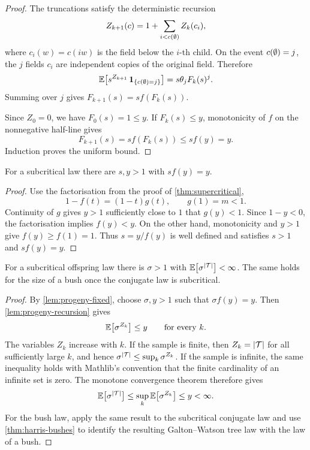 \begin{proof}
\leanok
The truncations satisfy the deterministic recursion
\[
  Z_{k+1}(c)=1+\sum_{i<c(\emptyset)}Z_k(c_i),
\]
where $c_i(w)=c(iw)$ is the field below the $i$-th child. On the event
$c(\emptyset)=j$, the $j$ fields $c_i$ are independent copies of the original field. Therefore
\[
  \mathbb{E}\bigl[s^{Z_{k+1}}\,\mathbf1_{\{c(\emptyset)=j\}}\bigr]
  =s\theta_jF_k(s)^j.
\]
Summing over $j$ gives $F_{k+1}(s)=s f(F_k(s))$.

Since $Z_0=0$, we have $F_0(s)=1\leq y$. If $F_k(s)\leq y$, monotonicity of $f$ on the
nonnegative half-line gives
\[
  F_{k+1}(s)=s f(F_k(s))\leq s f(y)=y.
\]
Induction proves the uniform bound.
\end{proof}

\begin{lemma}
\label{lem:progeny-fixed}
\leanok
For a subcritical law there are $s,y>1$ with $s f(y)=y$.
\end{lemma}

\begin{proof}
\leanok
Use the factorisation from the proof of \cref{thm:supercritical},
\[
  1-f(t)=(1-t)g(t),
  \qquad g(1)=m<1.
\]
Continuity of $g$ gives $y>1$ sufficiently close to $1$ that $g(y)<1$. Since $1-y<0$,
the factorisation implies $f(y)<y$. On the other hand, monotonicity and $y>1$ give
$f(y)\geq f(1)=1$. Thus $s=y/f(y)$ is well defined and satisfies $s>1$ and
$s f(y)=y$.
\end{proof}

\begin{theorem}
\label{thm:progeny-moment}
\leanok
For a subcritical offspring law there is $\sigma>1$ with
$\mathbb{E}\bigl[\sigma^{\lvert \mathcal{T} \rvert}\bigr]<\infty$. The same holds for the size of a bush once the
conjugate law is subcritical.
\end{theorem}

\begin{proof}
\leanok
By \cref{lem:progeny-fixed}, choose $\sigma,y>1$ such that $\sigma f(y)=y$.
Then \cref{lem:progeny-recursion} gives
\[
  \mathbb{E}\bigl[\sigma^{Z_k}\bigr]\leq y
  \qquad\text{for every }k.
\]
The variables $Z_k$ increase with $k$. If the sample is finite, then $Z_k=\lvert \mathcal{T} \rvert$ for
all sufficiently large $k$, and hence
$\sigma^{\lvert \mathcal{T} \rvert}\leq\sup_k\sigma^{Z_k}$. If the sample is infinite, the same inequality
holds with Mathlib's convention that the finite cardinality of an infinite set is zero.
The monotone convergence theorem therefore gives
\[
  \mathbb{E}\bigl[\sigma^{\lvert \mathcal{T} \rvert}\bigr]
  \leq \sup_k\mathbb{E}\bigl[\sigma^{Z_k}\bigr]
  \leq y<\infty.
\]
For the bush law, apply the same result to the subcritical conjugate law and use
\cref{thm:harris-bushes} to identify the resulting Galton--Watson tree law with the law of
a bush.
\end{proof}
